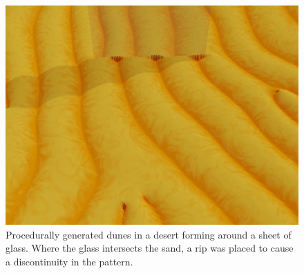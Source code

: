 \documentclass{utue} %
\begin{document}
\begin{figure}[ht]
  \centering
  \includegraphics[width=\linewidth]{images/desert}
  \caption{Procedurally generated dunes in a desert forming around a sheet of glass. Where the glass intersects the sand, a rip was placed to cause a discontinuity in the pattern.}\label{fig:desert}
\end{figure}
\end{document}

